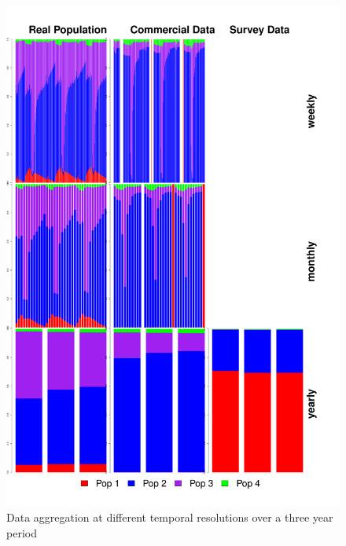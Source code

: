 \documentclass[review]{elsarticle}
\begin{document}
\begin{figure}[!ht]
	\includegraphics[width = \linewidth]{../analysis/Data_Aggregation_time}
	\caption{Data aggregation at different temporal resolutions over a
		three year period}
	\label{fig:2}
\end{figure}	
\end{document}
